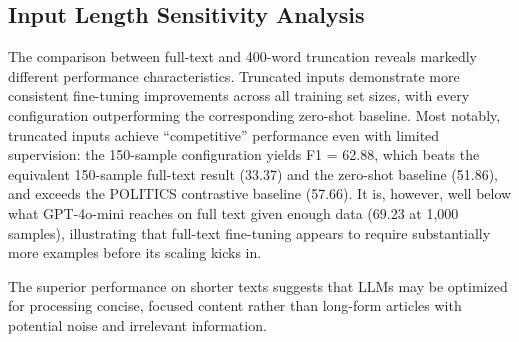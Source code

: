 \subsection{Input Length Sensitivity Analysis}

The comparison between full-text and 400-word truncation reveals markedly different performance characteristics. Truncated inputs demonstrate more consistent fine-tuning improvements across all training set sizes, with every configuration outperforming the corresponding zero-shot baseline. Most notably, truncated inputs achieve ``competitive'' performance even with limited supervision: the 150-sample configuration yields F1 = 62.88, which beats the equivalent 150-sample full-text result (33.37) and the zero-shot baseline (51.86), and exceeds the POLITICS contrastive baseline (57.66). It is, however, well below what GPT-4o-mini reaches on full text given enough data (69.23 at 1,000 samples), illustrating that full-text fine-tuning appears to require substantially more examples before its scaling kicks in.

The superior performance on shorter texts suggests that LLMs may be optimized for processing concise, focused content rather than long-form articles with potential noise and irrelevant information.
